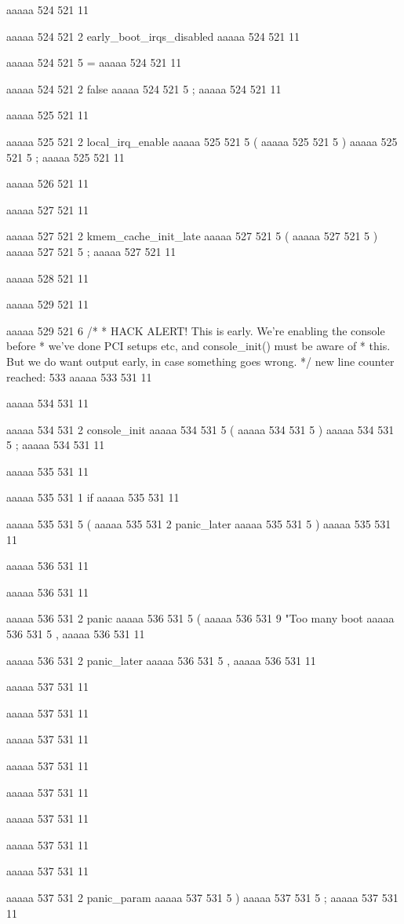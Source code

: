 {aaaaa 524 521
11
	
aaaaa 524 521
2
early_boot_irqs_disabled
aaaaa 524 521
11
 
aaaaa 524 521
5
=
aaaaa 524 521
11
 
aaaaa 524 521
2
false
aaaaa 524 521
5
;
aaaaa 524 521
11


aaaaa 525 521
11
	
aaaaa 525 521
2
local_irq_enable
aaaaa 525 521
5
(
aaaaa 525 521
5
)
aaaaa 525 521
5
;
aaaaa 525 521
11


aaaaa 526 521
11


aaaaa 527 521
11
	
aaaaa 527 521
2
kmem_cache_init_late
aaaaa 527 521
5
(
aaaaa 527 521
5
)
aaaaa 527 521
5
;
aaaaa 527 521
11


aaaaa 528 521
11


aaaaa 529 521
11
	
aaaaa 529 521
6
/*
	 * HACK ALERT! This is early. We're enabling the console before
	 * we've done PCI setups etc, and console_init() must be aware of
	 * this. But we do want output early, in case something goes wrong.
	 */
new line counter reached: 533
aaaaa 533 531
11


aaaaa 534 531
11
	
aaaaa 534 531
2
console_init
aaaaa 534 531
5
(
aaaaa 534 531
5
)
aaaaa 534 531
5
;
aaaaa 534 531
11


aaaaa 535 531
11
	
aaaaa 535 531
1
if
aaaaa 535 531
11
 
aaaaa 535 531
5
(
aaaaa 535 531
2
panic_later
aaaaa 535 531
5
)
aaaaa 535 531
11


aaaaa 536 531
11
	
aaaaa 536 531
11
	
aaaaa 536 531
2
panic
aaaaa 536 531
5
(
aaaaa 536 531
9
"Too many boot %
aaaaa 536 531
5
,
aaaaa 536 531
11
 
aaaaa 536 531
2
panic_later
aaaaa 536 531
5
,
aaaaa 536 531
11


aaaaa 537 531
11
	
aaaaa 537 531
11
	
aaaaa 537 531
11
 
aaaaa 537 531
11
 
aaaaa 537 531
11
 
aaaaa 537 531
11
 
aaaaa 537 531
11
 
aaaaa 537 531
11
 
aaaaa 537 531
2
panic_param
aaaaa 537 531
5
)
aaaaa 537 531
5
;
aaaaa 537 531
11


}
